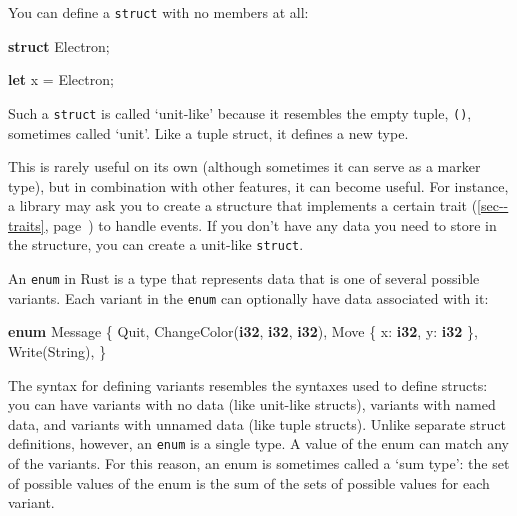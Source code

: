 \documentclass[a4paper,]{book}
\renewcommand*{\hyperref}[2][\ar]{%
  \def\ar{#2}%
  #2 (\autoref{#1}, page~\pageref{#1})}
\newenvironment{Shaded}{\begin{snugshade}}{\end{snugshade}}
\newcommand{\KeywordTok}[1]{\textcolor[rgb]{0.13,0.29,0.53}{\textbf{{#1}}}}
\newcommand{\NormalTok}[1]{{#1}}
\begin{document}
You can define a \texttt{struct} with no members at all:

\begin{Shaded}
\begin{Highlighting}[]
\KeywordTok{struct} \NormalTok{Electron;}

\KeywordTok{let} \NormalTok{x = Electron;}
\end{Highlighting}
\end{Shaded}

Such a \texttt{struct} is called `unit-like' because it resembles the
empty tuple, \texttt{()}, sometimes called `unit'. Like a tuple struct,
it defines a new type.

This is rarely useful on its own (although sometimes it can serve as a
marker type), but in combination with other features, it can become
useful. For instance, a library may ask you to create a structure that
implements a certain \hyperref[sec--traits]{trait} to handle events. If
you don't have any data you need to store in the structure, you can
create a unit-like \texttt{struct}.


An \texttt{enum} in Rust is a type that represents data that is one of
several possible variants. Each variant in the \texttt{enum} can
optionally have data associated with it:

\begin{Shaded}
\begin{Highlighting}[]
\KeywordTok{enum} \NormalTok{Message \{}
    \NormalTok{Quit,}
    \NormalTok{ChangeColor(}\KeywordTok{i32}\NormalTok{, }\KeywordTok{i32}\NormalTok{, }\KeywordTok{i32}\NormalTok{),}
    \NormalTok{Move \{ x: }\KeywordTok{i32}\NormalTok{, y: }\KeywordTok{i32} \NormalTok{\},}
    \NormalTok{Write(String),}
\NormalTok{\}}
\end{Highlighting}
\end{Shaded}

The syntax for defining variants resembles the syntaxes used to define
structs: you can have variants with no data (like unit-like structs),
variants with named data, and variants with unnamed data (like tuple
structs). Unlike separate struct definitions, however, an \texttt{enum}
is a single type. A value of the enum can match any of the variants. For
this reason, an enum is sometimes called a `sum type': the set of
possible values of the enum is the sum of the sets of possible values
for each variant.
\end{document}
